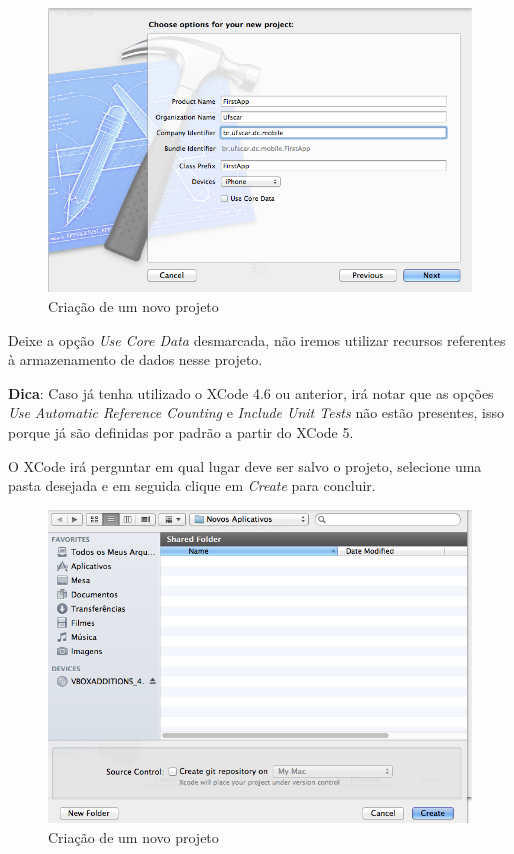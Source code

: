 \documentclass[a4paper,12pt,brazil,doubleside]{book}
\begin{document}
\begin{singlespace}
\begin{figure}[H]
  \centering
  \includegraphics[width=.75\textwidth]{figuras/3/tela_novo_projeto_2.png}
  \caption{Criação de um novo projeto}
  \label{fig:a}
\end{figure}


Deixe a opção \emph{Use Core Data} desmarcada, não iremos utilizar recursos referentes à armazenamento de dados nesse projeto.

\begin{framed}

\textbf{Dica}: Caso já tenha utilizado o XCode 4.6 ou anterior, irá notar que as opções 
\textit{ Use Automatic Reference Counting } e \textit{ Include Unit Tests } não estão presentes, isso porque já são definidas por padrão a partir do XCode 5.
\end{framed}


O XCode irá perguntar em qual lugar deve ser salvo o projeto, selecione uma pasta desejada e em seguida clique em \emph{Create} para concluir. 

\begin{figure}[H]
  \centering
  \includegraphics[width=.75\textwidth]{figuras/3/tela_novo_projeto_3.png}
  \caption{Criação de um novo projeto}
  \label{fig:a}
\end{figure}


\end{singlespace}
\end{document}
